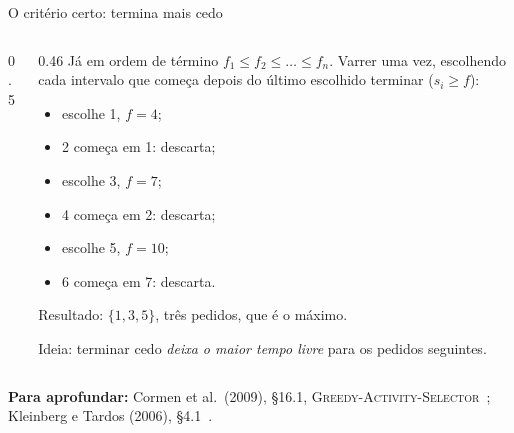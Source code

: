 \documentclass[aspectratio=169,xcolor=table]{beamer}
\newcommand{\fonte}[1]{%
  \vfill
  {\tiny\color{gray!55!black}\textbf{Para aprofundar:} #1\par}%
}
\begin{document}
\begin{frame}{O critério certo: termina mais cedo}
  \begin{columns}[c]
    \begin{column}{0.5\textwidth}
      \begin{center}
      \end{center}
    \end{column}
    \begin{column}{0.46\textwidth}
      \scriptsize
      Já em ordem de término $f_1 \le f_2 \le \dots \le f_n$. Varrer uma vez, escolhendo
      cada intervalo que começa depois do último escolhido terminar ($s_i \ge f$):
      \begin{itemize}
        \item escolhe 1, $f = 4$;
        \item 2 começa em 1: descarta;
        \item escolhe 3, $f = 7$;
        \item 4 começa em 2: descarta;
        \item escolhe 5, $f = 10$;
        \item 6 começa em 7: descarta.
      \end{itemize}
      Resultado: $\{1, 3, 5\}$, três pedidos, que é o máximo.
      \medskip

      Ideia: terminar cedo \emph{deixa o maior tempo livre} para os pedidos seguintes.
    \end{column}
  \end{columns}
  \fonte{Cormen et al.\ (2009), \S 16.1, \textsc{Greedy-Activity-Selector}~\cite{cormen2009introduction};
    Kleinberg e Tardos (2006), \S 4.1~\cite{kleinberg2006algorithm}.}
\end{frame}
\end{document}
